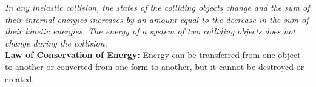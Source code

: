        \textit{In any inelastic collision, the states of the colliding objects change and the sum of their internal energies increases by an amount equal to the decrease in the sum of their kinetic energies. The energy
        of a system of two colliding objects does not change during the collision.} \\

        \textbf{Law of Conservation of Energy:} Energy can be transferred from one object to another or converted from one form to another, but it cannot be destroyed or created.

